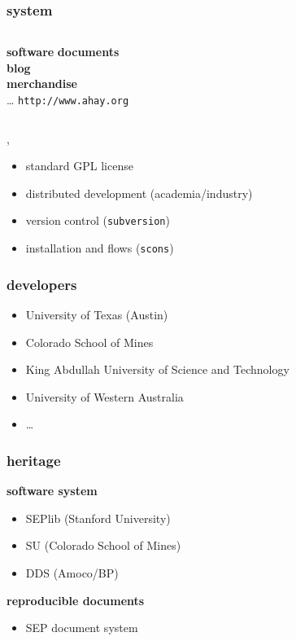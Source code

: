 \begin{frame} \frametitle{\mg system}

  \begin{columns}
    \textbf{software}
    \textbf{documents} \\
    \textbf{blog} \\
    \textbf{merchandise} \\
    \dots  
    \alert{ \texttt{http://www.ahay.org} }
  \end{columns}
  
  \sep
  
  \begin{itemize}
  \item standard GPL license
  \item distributed development (academia/industry)
  \item version control (\texttt{subversion})
  \item installation and flows (\texttt{scons})
  \end{itemize}
  
\end{frame}
\cwpnote{}


\begin{frame} \frametitle{\mg developers}

  \begin{itemize}
  \item University of Texas (Austin)
  \item Colorado School of Mines
  \item King Abdullah University of Science and Technology
  \item University of Western Australia
  \item \dots
  \end{itemize}
  
\end{frame}
\cwpnote{}


\begin{frame} \frametitle{\mg heritage}

  \textbf{software system}
  \begin{itemize}
  \item SEPlib (Stanford University)
  \item SU (Colorado School of Mines)
  \item DDS (Amoco/BP)
  \end{itemize}
  
  \vfill
  
  \textbf{reproducible documents}
  \begin{itemize}
  \item SEP document system
  \end{itemize}

\end{frame}
\cwpnote{}


